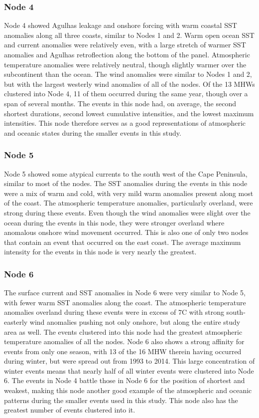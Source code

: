 \documentclass[utf8]{frontiersSCNS}
\begin{document}
\subsubsection{Node 4}
Node 4 showed Agulhas leakage and onshore forcing with warm coastal SST anomalies along all three coasts, similar to Nodes 1 and 2. Warm open ocean SST and current anomalies were relatively even, with a large stretch of warmer SST anomalies and Agulhas retroflection along the bottom of the panel. Atmospheric temperature anomalies were relatively neutral, though slightly warmer over the subcontinent than the ocean. The wind anomalies were similar to Nodes 1 and 2, but with the largest westerly wind anomalies of all of the nodes. Of the 13 MHWs clustered into Node 4, 11 of them occurred during the same year, though over a span of several months. The events in this node had, on average, the second shortest durations, second lowest cumulative intensities, and the lowest maximum intensities. This node therefore serves as a good representations of atmospheric and oceanic states during the smaller events in this study.

\subsubsection{Node 5}
Node 5 showed some atypical currents to the south west of the Cape Peninsula, similar to most of the nodes. The SST anomalies during the events in this node were a mix of warm and cold, with very mild warm anomalies present along most of the coast. The atmospheric temperature anomalies, particularly overland, were strong during these events. Even though the wind anomalies were slight over the ocean during the events in this node, they were stronger overland where anomalous onshore wind movement occurred. This is also one of only two nodes that contain an event that occurred on the east coast. The average maximum intensity for the events in this node is very nearly the greatest.

\subsubsection{Node 6}
The surface current and SST anomalies in Node 6 were very similar to Node 5, with fewer warm SST anomalies along the coast. The atmospheric temperature anomalies overland during these events were in excess of 7\degree C with strong south-easterly wind anomalies pushing not only onshore, but along the entire study area as well. The events clustered into this node had the greatest atmospheric temperature anomalies of all the nodes. Node 6 also shows a strong affinity for events from only one season, with 13 of the 16 MHW therein having occurred during winter, but were spread out from 1993 to 2014. This large concentration of winter events means that nearly half of all winter events were clustered into Node 6. The events in Node 4 battle those in Node 6 for the position of shortest and weakest, making this node another good example of the atmospheric and oceanic patterns during the smaller events used in this study. This node also has the greatest number of events clustered into it.
\end{document}
